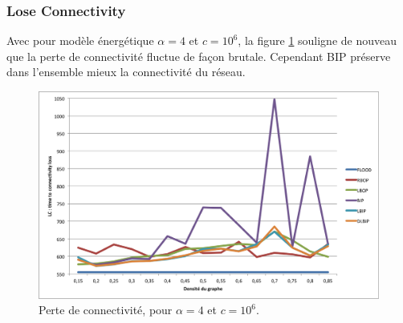 \subsubsection{Lose Connectivity}

Avec pour modèle énergétique $\alpha = 4$ et $c = 10^6$, la figure \ref{LC2} souligne de nouveau que la perte de connectivité fluctue de façon brutale. Cependant BIP préserve dans l'ensemble mieux la connectivité du réseau.


\begin{figure}[H]
\begin{bigcenter}
\includegraphics[scale=0.75]{Simus/lc_4_10p6}
\caption{Perte de connectivité, pour $\alpha = 4$ et $c = 10^6$.}
\label{LC2}
\end{bigcenter}
\end{figure}
